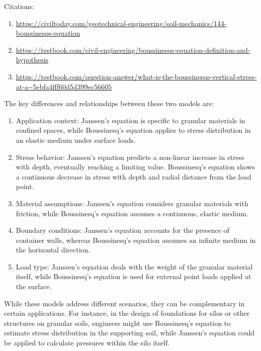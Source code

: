 \documentclass[xcolor=dvipsnames,10pt,hidelinks]{article}
\begin{document}
\begin{itemize}
\begin{itemize}
Citations:
\begin{enumerate}
\item \url{https://civiltoday.com/geotechnical-engineering/soil-mechanics/144-boussinesqs-equation}
\item \url{https://testbook.com/civil-engineering/boussinesqs-equation-definition-and-hypothesis}
\item \url{https://testbook.com/question-answer/what-is-the-boussinesqs-vertical-stress-at-a--5ebfa4fff60d5d399ec56605}
\end{enumerate}
\end{itemize}


The key differences and relationships between these two models are:

\begin{enumerate}
\item Application context: Janssen's equation is specific to granular materials in confined spaces, while Boussinesq's equation applies to stress distribution in an elastic medium under surface loads.

\item Stress behavior: Janssen's equation predicts a non-linear increase in stress with depth, eventually reaching a limiting value. Boussinesq's equation shows a continuous decrease in stress with depth and radial distance from the load point.

\item Material assumptions: Janssen's equation considers granular materials with friction, while Boussinesq's equation assumes a continuous, elastic medium.

\item Boundary conditions: Janssen's equation accounts for the presence of container walls, whereas Boussinesq's equation assumes an infinite medium in the horizontal direction.

\item Load type: Janssen's equation deals with the weight of the granular material itself, while Boussinesq's equation is used for external point loads applied at the surface.
\end{enumerate}

While these models address different scenarios, they can be complementary in certain applications.
For instance, in the design of foundations for silos or other structures on granular soils,
engineers might use Boussinesq's equation to estimate stress distribution in the supporting soil,
while Janssen's equation could be applied to calculate pressures within the silo itself.


\end{itemize}
\end{document}

